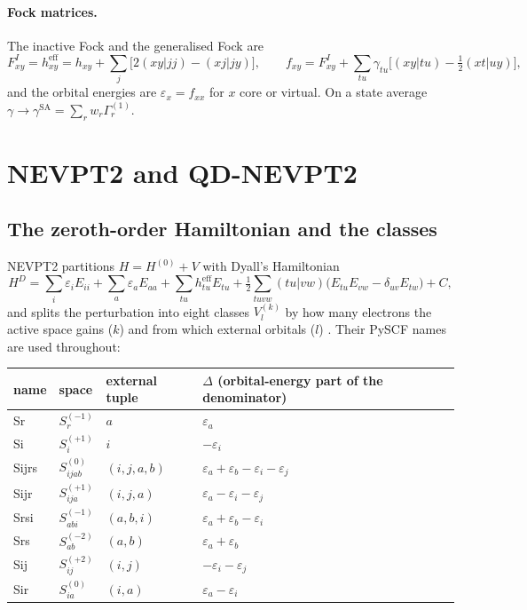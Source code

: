 \documentclass[11pt]{article}
\newcommand{\G}[1]{\Gamma^{(#1)}}
\newcommand{\eps}{\varepsilon}
\newcommand{\heff}{h^{\mathrm{eff}}}
\begin{document}
\paragraph{Fock matrices.} The inactive Fock and the generalised Fock are
\begin{equation}
  F^I_{xy} = \heff_{xy} = h_{xy} + \sum_j\bigl[2(xy|jj) - (xj|jy)\bigr],\qquad
  f_{xy} = F^I_{xy} + \sum_{tu}\gamma_{tu}\bigl[(xy|tu) - \tfrac12(xt|uy)\bigr],
  \label{eq:fock}
\end{equation}
and the orbital energies are $\eps_x = f_{xx}$ for $x$ core or virtual. On a
state average $\gamma \to \gamma^{\mathrm{SA}} = \sum_r w_r\G1_r$.

\section{NEVPT2 and QD-NEVPT2}
\label{sec:theory}

\subsection{The zeroth-order Hamiltonian and the classes}

NEVPT2 partitions $H = H^{(0)} + V$ with Dyall's Hamiltonian
\cite{dyall1995}
\begin{equation}
  H^D = \sum_i \eps_i E_{ii} + \sum_a \eps_a E_{aa}
      + \sum_{tu}\heff_{tu}E_{tu}
      + \tfrac12\sum_{tuvw}(tu|vw)\bigl(E_{tu}E_{vw} - \delta_{uv}E_{tw}\bigr) + C,
  \label{eq:dyall}
\end{equation}
and splits the perturbation into eight classes $V^{(k)}_l$ by how many
electrons the active space gains ($k$) and from which external orbitals
($l$) \cite{angeli2001}. Their PySCF names are used throughout:

\begin{center}
\small
\begin{tabular}{@{}llll@{}}
\toprule
name & space & external tuple & $\Delta$ (orbital-energy part of the denominator) \\
\midrule
Sr     & $S^{(-1)}_r$   & $a$ & $\eps_a$ \\
Si     & $S^{(+1)}_i$   & $i$ & $-\eps_i$ \\
Sijrs  & $S^{(0)}_{ijab}$ & $(i,j,a,b)$ & $\eps_a + \eps_b - \eps_i - \eps_j$ \\
Sijr   & $S^{(+1)}_{ija}$ & $(i,j,a)$ & $\eps_a - \eps_i - \eps_j$ \\
Srsi   & $S^{(-1)}_{abi}$ & $(a,b,i)$ & $\eps_a + \eps_b - \eps_i$ \\
Srs    & $S^{(-2)}_{ab}$  & $(a,b)$ & $\eps_a + \eps_b$ \\
Sij    & $S^{(+2)}_{ij}$  & $(i,j)$ & $-\eps_i - \eps_j$ \\
Sir    & $S^{(0)}_{ia}$   & $(i,a)$ & $\eps_a - \eps_i$ \\
\bottomrule
\end{tabular}
\end{center}
\end{document}
